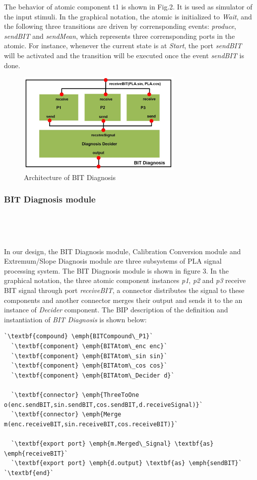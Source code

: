 The behavior of atomic component t1 is shown in Fig.2. It is used as simulator of the input stimuli. In the graphical notation, the atomic is initialized to \emph{Wait}, and the following three transitions are driven by corrensponding events: \emph{produce}, \emph{sendBIT} and \emph{sendMean}, which represents three corrensponding ports in the atomic. For instance, whenever the current state is at \emph{Start}, the port \emph{sendBIT} will be activated and the transition will be executed once the event \emph{sendBIT} is done.

\begin{figure}[ht!]
	\centering
	\includegraphics[width=80mm]{figure/figure4.jpg}
	\caption{Architecture of BIT Diagnosis}
	\label{BIT_Model}
\end{figure}

\subsubsection{BIT Diagnosis module}

\ 

\ 

\noindent In our design, the BIT Diagnosis module, Calibration Conversion module and Extremum/Slope Diagnosis module are three subsystems of PLA signal processing system. The BIT Diagnosis module is shown in figure 3. In the graphical notation, the three atomic component instances \emph{p1}, \emph{p2} and \emph{p3} receive BIT signal through port \emph{receiveBIT}, a connector distributes the signal to these components and another connector merges their output and sends it to the an instance of \emph{Decider} component. The BIP description of the definition and instantiation of \emph{BIT Diagnosis} is shown below:

\begin{lstlisting}
`\textbf{compound} \emph{BITCompound\_P1}`
  `\textbf{component} \emph{BITAtom\_enc enc}`
  `\textbf{component} \emph{BITAtom\_sin sin}`
  `\textbf{component} \emph{BITAtom\_cos cos}`
  `\textbf{component} \emph{BITAtom\_Decider d}`
  
  `\textbf{connector} \emph{ThreeToOne o(enc.sendBIT,sin.sendBIT,cos.sendBIT,d.receiveSignal)}`
  `\textbf{connector} \emph{Merge m(enc.receiveBIT,sin.receiveBIT,cos.receiveBIT)}`
  
  `\textbf{export port} \emph{m.Merged\_Signal} \textbf{as} \emph{receiveBIT}`
  `\textbf{export port} \emph{d.output} \textbf{as} \emph{sendBIT}`
`\textbf{end}`
\end{lstlisting}

